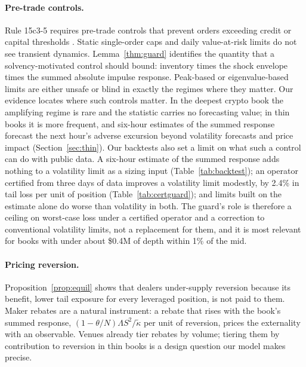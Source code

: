 \documentclass[12pt]{article}
\theoremstyle{definition}
\theoremstyle{remark}
\begin{document}
\paragraph{Pre-trade controls.} Rule 15c3-5 requires pre-trade controls that prevent orders exceeding credit or capital thresholds \citep{sec2010}. Static single-order caps and daily value-at-risk limits do not see transient dynamics. Lemma~\ref{thm:guard} identifies the quantity that a solvency-motivated control should bound: inventory times the shock envelope times the summed absolute impulse response. Peak-based or eigenvalue-based limits are either unsafe or blind in exactly the regimes where they matter. Our evidence locates where such controls matter. In the deepest crypto book the amplifying regime is rare and the statistic carries no forecasting value; in thin books it is more frequent, and six-hour estimates of the summed response forecast the next hour's adverse excursion beyond volatility forecasts and price impact (Section~\ref{sec:thin}). Our backtests also set a limit on what such a control can do with public data. A six-hour estimate of the summed response adds nothing to a volatility limit as a sizing input (Table~\ref{tab:backtest}); an operator certified from three days of data improves a volatility limit modestly, by 2.4\% in tail loss per unit of position (Table~\ref{tab:certguard}); and limits built on the estimate alone do worse than volatility in both. The guard's role is therefore a ceiling on worst-case loss under a certified operator and a correction to conventional volatility limits, not a replacement for them, and it is most relevant for books with under about \$0.4M of depth within 1\% of the mid.

\paragraph{Pricing reversion.} Proposition~\ref{prop:equil} shows that dealers under-supply reversion because its benefit, lower tail exposure for every leveraged position, is not paid to them. Maker rebates are a natural instrument: a rebate that rises with the book's summed response, $(1-\theta/N)\Lambda S^2/\tilde\kappa$ per unit of reversion, prices the externality with an observable. Venues already tier rebates by volume; tiering them by contribution to reversion in thin books is a design question our model makes precise.
\end{document}
